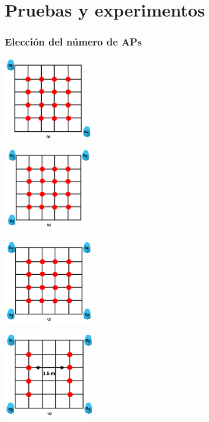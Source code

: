\documentclass{beamer}
\begin{document}
\section{Pruebas y experimentos}
\begin{frame}
\frametitle{Elección del número de APs}
\centering

\begin{minipage}{0.45\textwidth}
    \centering
    \includegraphics[width=4.0cm]{figs/dos_apes.png}
\end{minipage}
\hfill
\begin{minipage}{0.45\textwidth}
    \centering
    \includegraphics[width=4.0cm]{figs/tres_apes.png}
\end{minipage}

\vspace{0.3cm} %

\begin{minipage}{0.45\textwidth}
    \centering
    \includegraphics[width=4.0cm]{figs/cuatro_apes.png} %
\end{minipage}
\hfill
\begin{minipage}{0.45\textwidth}
    \centering
    \includegraphics[width=4.0cm]{figs/cuatro_apes_espaciados.png} %
\end{minipage}

\end{frame}
\end{document}
